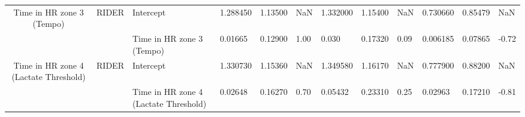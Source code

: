 \begin{tabular}{c}
Time in HR zone 3 (Tempo) & RIDER & Intercept &   1.288450 &  1.13500 &   NaN &  1.332000 &  1.15400 &   NaN &  0.730660 &  0.85479 &   NaN \\
                                      &       & Time in HR zone 3 (Tempo) &    0.01665 &  0.12900 &  1.00 &     0.030 &  0.17320 &  0.09 &  0.006185 &  0.07865 & -0.72 \\
Time in HR zone 4 (Lactate Threshold) & RIDER & Intercept &   1.330730 &  1.15360 &   NaN &  1.349580 &  1.16170 &   NaN &  0.777900 &  0.88200 &   NaN \\
                                      &       & Time in HR zone 4 (Lactate Threshold) &    0.02648 &  0.16270 &  0.70 &   0.05432 &  0.23310 &  0.25 &   0.02963 &  0.17210 & -0.81 \\
\bottomrule
\end{tabular}
